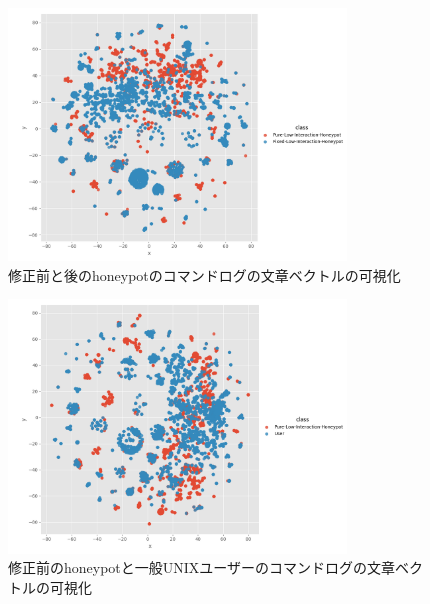 \vspace{10mm}
\begin{figure}[htbp]
    \centering
    \includegraphics[width=0.8\textwidth]{figures/sufix.png}
    \caption{修正前と後のhoneypotのコマンドログの文章ベクトルの可視化}
    \label{fig:tsne1}
\end{figure}
\vspace{10mm}

\vspace{10mm}
\begin{figure}[htbp]
    \centering
    \includegraphics[width=0.8\textwidth]{figures/suuser.png}
    \caption{修正前のhoneypotと一般UNIXユーザーのコマンドログの文章ベクトルの可視化}
    \label{fig:tsne2}
\end{figure}
\vspace{10mm}

